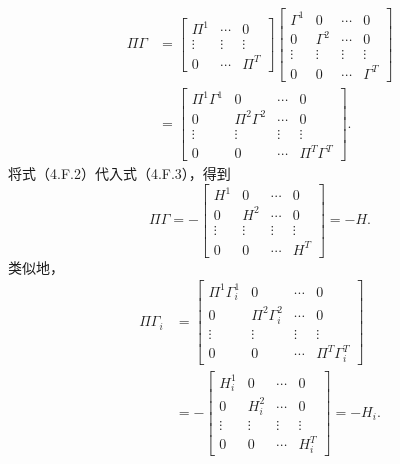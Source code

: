 \begin{equation}
\begin{aligned}
\Pi\Gamma
&=\begin{bmatrix}\Pi^1&\cdots&0\\\vdots&\vdots&\vdots\\0&\cdots&\Pi^T\end{bmatrix}
\begin{bmatrix}
\Gamma^1&0&\cdots&0\\0&\Gamma^2&\cdots&0\\
\vdots&\vdots&\vdots&\vdots\\0&0&\cdots&\Gamma^T
\end{bmatrix}\\
&=\begin{bmatrix}
\Pi^1\Gamma^1&0&\cdots&0\\0&\Pi^2\Gamma^2&\cdots&0\\
\vdots&\vdots&\vdots&\vdots\\0&0&\cdots&\Pi^T\Gamma^T
\end{bmatrix}.
\end{aligned}\tag{4.F.3}
\end{equation}
将式（4.F.2）代入式（4.F.3），得到
\begin{equation}
\Pi\Gamma=-\begin{bmatrix}
H^1&0&\cdots&0\\0&H^2&\cdots&0\\
\vdots&\vdots&\vdots&\vdots\\0&0&\cdots&H^T
\end{bmatrix}=-H.\tag{4.F.4}
\end{equation}
类似地，
\begin{equation}
\begin{aligned}
\Pi\Gamma_i
&=\begin{bmatrix}
\Pi^1\Gamma_i^1&0&\cdots&0\\0&\Pi^2\Gamma_i^2&\cdots&0\\
\vdots&\vdots&\vdots&\vdots\\0&0&\cdots&\Pi^T\Gamma_i^T
\end{bmatrix}\\
&=-\begin{bmatrix}
H_i^1&0&\cdots&0\\0&H_i^2&\cdots&0\\
\vdots&\vdots&\vdots&\vdots\\0&0&\cdots&H_i^T
\end{bmatrix}=-H_i.
\end{aligned}\tag{4.F.5}
\end{equation}
